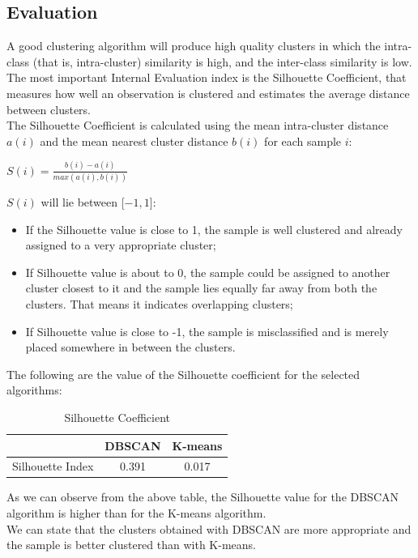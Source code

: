 \documentclass[fleqn,10pt]{SelfArx} %
\begin{document}
\subsection{Evaluation}
A good clustering algorithm will produce high quality clusters in which the intra-class (that is, intra-cluster) similarity is high, and the inter-class similarity is low.\\
The most important Internal Evaluation index is the Silhouette Coefficient, that measures how well an observation is clustered and estimates the average distance between clusters.\\
The Silhouette Coefficient is calculated using the mean intra-cluster distance $a(i)$ and the mean nearest cluster distance $b(i)$ for each sample $i$:\\

\begin{center}
$S(i) = \frac{b(i) - a(i)}{max(a(i), b(i))}$
\end{center}

$S(i)$ will lie between [$ -1,1 $]:
\begin{itemize}
	\item If the Silhouette value is close to 1, the sample is well clustered and already assigned to a very appropriate cluster;
	\item If Silhouette value is about to 0, the sample could be assigned to another cluster closest to it and the sample lies equally far away from both the clusters. That means it indicates overlapping clusters;
	\item If Silhouette value is close to -1, the sample is misclassified and is merely placed somewhere in between the clusters.
\end{itemize}

The following are the value of the Silhouette coefficient for the selected algorithms:

\begin{table}[ht]
\centering
\begin{tabular}{c c c }
	 & DBSCAN & K-means  \\
	\hline
	Silhouette Index & 0.391 & 0.017  \\
\end{tabular}
\caption{Silhouette Coefficient}
\end{table}

As we can observe from the above table, the Silhouette value for the DBSCAN algorithm is higher than for the K-means algorithm.\\
We can state that the clusters obtained with DBSCAN are more appropriate and the sample is better clustered than with K-means.
\end{document}
